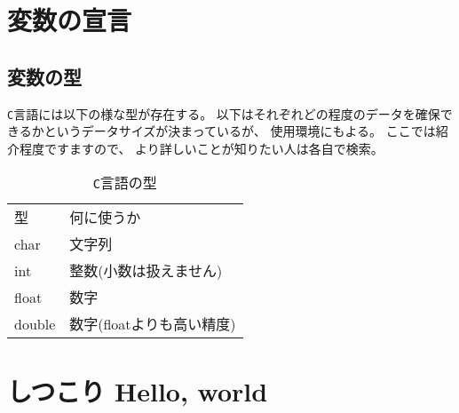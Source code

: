 \section{変数の宣言}
  \subsection{変数の型}
\texttt{C}言語には以下の様な型が存在する。
以下はそれぞれどの程度のデータを確保できるかというデータサイズが決まっているが、
使用環境にもよる。
ここでは紹介程度ですますので、
より詳しいことが知りたい人は各自で検索。
\begin{table}[H]
 \begin{tabular}{ll}
  型 & 何に使うか \\
  char   & 文字列 \\
  int    & 整数(小数は扱えません) \\
  float  & 数字 \\
  double & 数字(floatよりも高い精度) \\
 \end{tabular}
 \caption{\texttt{C}言語の型}
\end{table}

  
\section{しつこり Hello, world}
